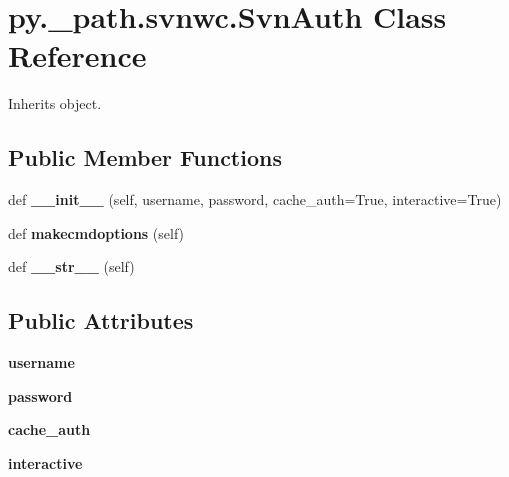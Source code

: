 \hypertarget{classpy_1_1__path_1_1svnwc_1_1_svn_auth}{}\section{py.\+\_\+path.\+svnwc.\+Svn\+Auth Class Reference}
\label{classpy_1_1__path_1_1svnwc_1_1_svn_auth}


Inherits object.

\subsection*{Public Member Functions}
\begin{DoxyCompactItemize}
\item 
\mbox{\label{classpy_1_1__path_1_1svnwc_1_1_svn_auth_aceee10cd025ffb7691b7097e4d6af579}} 
def {\bfseries \+\_\+\+\_\+init\+\_\+\+\_\+} (self, username, password, cache\+\_\+auth=True, interactive=True)
\item 
\mbox{\label{classpy_1_1__path_1_1svnwc_1_1_svn_auth_a77714436c2ed88e8f5cf3d22ccf7798d}} 
def {\bfseries makecmdoptions} (self)
\item 
\mbox{\label{classpy_1_1__path_1_1svnwc_1_1_svn_auth_a4ce182ec8d8c63bdc17a898e462ab33b}} 
def {\bfseries \+\_\+\+\_\+str\+\_\+\+\_\+} (self)
\end{DoxyCompactItemize}
\subsection*{Public Attributes}
\begin{DoxyCompactItemize}
\item 
\mbox{\label{classpy_1_1__path_1_1svnwc_1_1_svn_auth_a073d3ac8089ac3efd0af509e4faf6a61}} 
{\bfseries username}
\item 
\mbox{\label{classpy_1_1__path_1_1svnwc_1_1_svn_auth_a9bbc8f12eab95825b65d2fbfe7cd7c10}} 
{\bfseries password}
\item 
\mbox{\label{classpy_1_1__path_1_1svnwc_1_1_svn_auth_aa9909af931a0ed359437dbc1d817a559}} 
{\bfseries cache\+\_\+auth}
\item 
\mbox{\label{classpy_1_1__path_1_1svnwc_1_1_svn_auth_a8b182dd30719cc1b892fdd893a837395}} 
{\bfseries interactive}
\end{DoxyCompactItemize}


